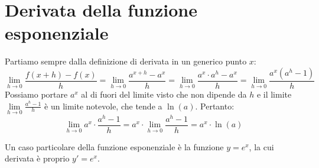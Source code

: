\documentclass{report}
\begin{document}
\section{Derivata della funzione esponenziale}
\begin{myproof}
Partiamo sempre dalla definizione di derivata in un generico punto $x$:
$$
\lim_{h \to 0} \frac{f(x+h)-f(x)}{h} = \lim_{h \to 0} \frac{a^{x+h}-a^x}{h} = \lim_{h \to 0} \frac{a^x \cdot a^h - a^x}{h} = \lim_{h \to 0} \frac{a^x\left(a^h - 1\right)}{h}
$$
Possiamo portare $a^x$ al di fuori del limite visto che non dipende da $h$ e il limite $\lim\limits_{h \to 0} \frac{a^h - 1}{h}$ è un limite notevole, che tende a $\ln(a)$. Pertanto:
$$
	\lim_{h \to 0} a^x \cdot \frac{a^h - 1}{h} = a^x \cdot \lim_{h \to 0} \frac{a^h - 1}{h} = a^{x} \cdot \ln(a)
$$
\end{myproof}
\noindent Un caso particolare della funzione esponenziale è la funzione $y=e^x$, la cui derivata è proprio $y' = e^x$.
\end{document}
